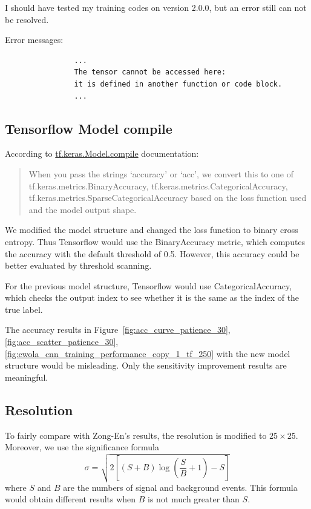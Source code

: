 \documentclass[12pt]{article}
\begin{document}
            I should have tested my training codes on version 2.0.0, but an error still can not be resolved.

            Error messages:
            \begin{verbatim}
                ...
                The tensor cannot be accessed here:
                it is defined in another function or code block.
                ...
            \end{verbatim}
    \subsection{Tensorflow Model compile}%
    \label{sub:tensorflow_model_compile}
        According to \href{https://www.tensorflow.org/api_docs/python/tf/keras/Model#compile}{tf.keras.Model.compile} documentation:
        \begin{quote}
            When you pass the strings `accuracy' or `acc', we convert this to one of \newline tf.keras.metrics.BinaryAccuracy, tf.keras.metrics.CategoricalAccuracy, \newline tf.keras.metrics.SparseCategoricalAccuracy based on the loss function used and the model output shape.
        \end{quote}
        We modified the model structure and changed the loss function to binary cross entropy. Thus Tensorflow would use the BinaryAccuracy metric, which computes the accuracy with the default threshold of 0.5. However, this accuracy could be better evaluated by threshold scanning.

        For the previous model structure, Tensorflow would use CategoricalAccuracy, which checks the output index to see whether it is the same as the index of the true label.

        The accuracy results in Figure~\ref{fig:acc_curve_patience_30}, \ref{fig:acc_scatter_patience_30}, \ref{fig:cwola_cnn_training_performance_copy_1_tf_250} with the new model structure would be misleading. Only the sensitivity improvement results are meaningful.
    \subsection{Resolution}%
    \label{sub:resolution}
        To fairly compare with Zong-En's results, the resolution is modified to $25 \times 25$. Moreover, we use the significance formula
        \begin{equation}
            \sigma = \sqrt{2\left[ \left( S+B \right) \log\left( \frac{S}{B} + 1 \right) - S  \right] }
        \end{equation}
        where $S$ and $B$ are the numbers of signal and background events. This formula would obtain different results when $B$ is not much greater than $S$.
\end{document}
